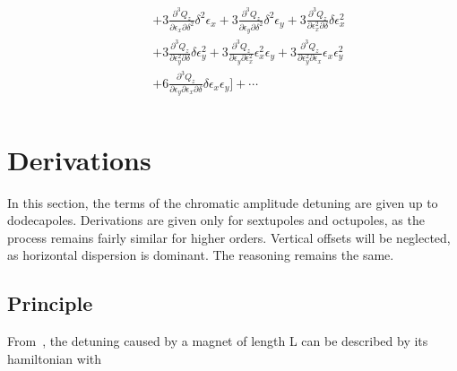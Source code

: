 \begin{equation}
\begin{aligned}
\begin{aligned}
                                             \phantom{+ \frac{1}{3!} \biggl[} 
                                               &+ 3 \frac{\partial^{3} Q_z}{\partial \epsilon_{x}\partial \delta^{2}} \delta^{2} \epsilon_{x} 
                                                + 3  \frac{\partial^{3} Q_z}{\partial \epsilon_{y}\partial \delta^{2}}  \delta^{2} \epsilon_{y}
                                                + 3 \frac{\partial^{3} Q_z}{\partial \epsilon_{x}^{2}\partial \delta}  \delta \epsilon_{x}^{2} \\
                                               &+ 3 \frac{\partial^{3} Q_z}{\partial \epsilon_{y}^{2}\partial \delta} \delta \epsilon_{y}^{2}  
                                                + 3  \frac{\partial^{3} Q_z}{\partial \epsilon_{y}\partial \epsilon_{x}^{2}} \epsilon_{x}^{2} \epsilon_{y} 
                                                + 3 \frac{\partial^{3} Q_z}{\partial \epsilon_{y}^{2}\partial \epsilon_{x}} \epsilon_{x} \epsilon_{y}^{2} \\
                                               &+ 6 \frac{\partial^{3} Q_z}{\partial \epsilon_{y}\partial  \epsilon_{x}\partial \delta} \delta \epsilon_{x} \epsilon_{y} 
                                             \biggr] + \cdots \\
                                             \end{aligned}
\end{aligned}
\end{equation}


\section{Derivations}

In this section, the terms of the chromatic amplitude detuning are given up to dodecapoles.
Derivations are given only for sextupoles and octupoles, as the process remains fairly similar for
higher orders.
Vertical offsets will be neglected, as horizontal dispersion is dominant. The reasoning remains the 
same.


\subsection{Principle}

From~\cite{dilly_derivation_2023}, the detuning caused by a magnet of length L can be described by
its hamiltonian with 

